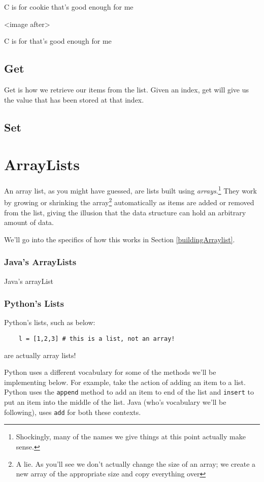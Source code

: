 C is for cookie that's good enough for me 

<image after>

C is for that's good enough for me 

\subsection{Get}

Get is how we retrieve our items from the list.  Given an index, get will give us the value that has been stored at that index.



\subsection{Set}

\section{ArrayLists}
An array list, as you might have guessed, are lists built using \textit{arrays}.\footnote{Shockingly, many of the names we give things at this point actually make sense.}
They work by growing or shrinking the array\footnote{A lie.  As you'll see we don't actually change the size of an array;  we create a new array of the appropriate size and copy everything over} automatically as items are added or removed from the list, giving the illusion that the data structure can hold an arbitrary amount of data.

We'll go into the specifics of how this works in Section \ref{buildingArraylist}.


\subsubsection{Java's ArrayLists}
Java's arrayList
\subsubsection{Python's Lists}
Python's lists, such as below:
\begin{verbatim}
	l = [1,2,3] # this is a list, not an array!	
\end{verbatim}
are actually array lists! %

Python uses a different vocabulary for some of the methods we'll be implementing below.  
For example, take the action of adding an item to a list.
Python uses the \texttt{append} method to add an item to end of the list and \texttt{insert} to put an item into the middle of the list.
Java (who's vocabulary we'll be following), uses \texttt{add} for both these contexts. 









